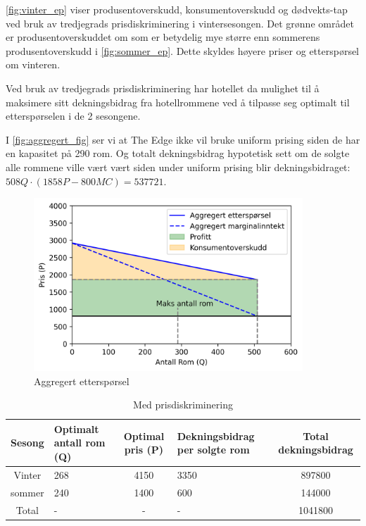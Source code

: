 \documentclass[
  12pt,
  a4paper,
  DIV=11,
  numbers=noendperiod]{scrartcl}
\begin{document}
\autoref{fig:vinter_ep} viser produsentoverskudd, konsumentoverskudd og
dødvekts-tap ved bruk av tredjegrads prisdiskriminering i
vintersesongen. Det grønne området er produsentoverskuddet om som er
betydelig mye større enn sommerens produsentoverskudd i
\autoref{fig:sommer_ep}. Dette skyldes høyere priser og etterspørsel om
vinteren.

Ved bruk av tredjegrads prisdiskriminering har hotellet da mulighet til
å maksimere sitt dekningsbidrag fra hotellrommene ved å tilpasse seg
optimalt til etterspørselen i de 2 sesongene.

\clearpage

I \autoref{fig:aggregert_fig} ser vi at The Edge ikke vil bruke uniform
prising siden de har en kapasitet på 290 rom. Og totalt dekningsbidrag
hypotetisk sett om de solgte alle rommene ville vært vært siden under
uniform prising blir dekningsbidraget:
\(508Q \cdot (1858P-800MC) = 537721\).

\begin{figure}[h]
  \includegraphics[width=0.9\textwidth]{dokumentobjekter/figurer/aggregert_fig.png}
  \caption{Aggregert etterspørsel}
  \label{fig:aggregert_fig}
\end{figure}

\begin{table}[h]
\centering
\begin{tabular}{|c|p{3cm}|c|p{3cm}|c|}
\hline
Sesong & Optimalt antall rom (Q) & Optimal pris (P) & Dekningsbidrag per solgte rom & Total dekningsbidrag \\
\hline
Vinter & 268 & 4150 & 3350 & 897800\\
\hline
sommer & 240 & 1400 & 600 & 144000 \\
\hline
Total & - & - & - & 1041800 \\
\hline
\end{tabular}
\caption{Med prisdiskriminering}
\label{table:med_diskrim}
\end{table}
\end{document}
